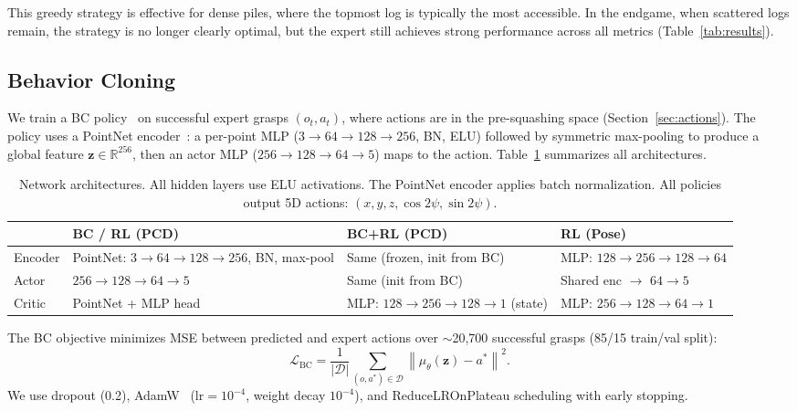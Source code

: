 \documentclass[conference]{IEEEtran}
\begin{document}
This greedy strategy is effective for dense piles, where the topmost log is typically the most accessible.
In the endgame, when scattered logs remain, the strategy is no longer clearly optimal, but the expert still achieves strong performance across all metrics (Table~\ref{tab:results}).

\subsection{Behavior Cloning}
\label{sec:bc}
We train a BC policy~\cite{pomerleau1988alvinn} on successful expert grasps $(o_t, a_t)$, where actions are in the pre-squashing space (Section~\ref{sec:actions}).
The policy uses a PointNet encoder~\cite{qi2017pointnet}: a per-point MLP ($3 \!\to\! 64 \!\to\! 128 \!\to\! 256$, BN, ELU) followed by symmetric max-pooling to produce a global feature $\mathbf{z} \in \mathbb{R}^{256}$, then an actor MLP ($256 \!\to\! 128 \!\to\! 64 \!\to\! 5$) maps to the action.
Table~\ref{tab:architecture} summarizes all architectures.

\begin{table}[t]
\centering
\caption{Network architectures. All hidden layers use ELU activations. The PointNet encoder applies batch normalization. All policies output 5D actions: $(x,y,z,\cos 2\psi,\sin 2\psi)$.}
\label{tab:architecture}
\setlength{\tabcolsep}{3pt}
\begin{tabular}{@{}lp{2.4cm}p{2.4cm}p{2.0cm}@{}}
\toprule
& \textbf{BC / RL (PCD)} & \textbf{BC+RL (PCD)} & \textbf{RL (Pose)} \\
\midrule
Encoder
  & PointNet: $3\!\to\!64\!\to\!128\!\to\!256$, BN, max-pool
  & Same (frozen, init from BC)
  & MLP: $128\!\to\!256\!\to\!128\!\to\!64$ \\[3pt]
Actor
  & $256\!\to\!128\!\to\!64\!\to\!5$
  & Same (init from BC)
  & Shared enc $\to$ $64\!\to\!5$ \\[3pt]
Critic
  & PointNet + MLP head
  & MLP: $128\!\to\!256\!\to\!128\!\to\!1$ (state)
  & MLP: $256\!\to\!128\!\to\!64\!\to\!1$ \\
\bottomrule
\end{tabular}
\end{table}

The BC objective minimizes MSE between predicted and expert actions over $\sim$20{,}700 successful grasps (85/15 train/val split):
\begin{equation}
    \mathcal{L}_{\text{BC}} = \frac{1}{|\mathcal{D}|}\sum_{(o,a^*)\in\mathcal{D}} \left\| \mu_\theta(\mathbf{z}) - a^* \right\|^2.
\end{equation}
We use dropout (0.2), AdamW~\cite{loshchilov2019adamw} ($\text{lr}=10^{-4}$, weight decay $10^{-4}$), and ReduceLROnPlateau scheduling with early stopping.
\end{document}
